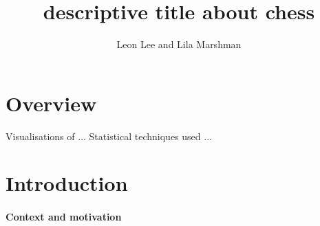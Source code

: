 \documentclass[11pt,a4paper]{article}
\title{descriptive title about chess}
\author{Leon Lee and Lila Marshman}
\begin{document}
\maketitle


\section{Overview}

Visualisations of ...
Statistical techniques used ...

\section{Introduction}

\paragraph{Context and motivation}
\end{document}
